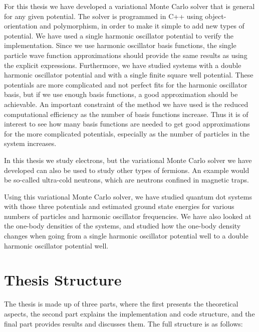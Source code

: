 \documentclass[../main.tex]{subfiles}
\begin{document}
For this thesis we have developed a variational Monte Carlo solver that is general for any given potential. The solver is programmed in C++ using object-orientation and polymorphism, in order to make it simple to add new types of potential. We have used a single harmonic oscillator potential to verify the implementation. Since we use harmonic oscillator basis functions, the single particle wave function approximations should provide the same results as using the explicit expressions. Furthermore, we have studied systems with a double harmonic oscillator potential and with a single finite square well potential. These potentials are more complicated and not perfect fits for the harmonic oscillator basis, but if we use enough basis functions, a good approximation should be achievable. An important constraint of the method we have used is the reduced computational efficiency as the number of basis functions increase. Thus it is of interest to see how many basis functions are needed to get good approximations for the more complicated potentials, especially as the number of particles in the system increases.

In this thesis we study electrons, but the variational Monte Carlo solver we have developed can also be used to study other types of fermions. An example would be so-called ultra-cold neutrons, which are neutrons confined in magnetic traps\cite{ultra-cold neutrons}.

Using this variational Monte Carlo solver, we have studied quantum dot systems with those three potentials and estimated ground state energies for various numbers of particles and harmonic oscillator frequencies. We have also looked at the one-body densities of the systems, and studied how the one-body density changes when going from a single harmonic oscillator potential well to a double harmonic oscillator potential well.

\section*{Thesis Structure}
The thesis is made up of three parts, where the first presents the theoretical aspects, the second part explains the implementation and code structure, and the final part provides results and discusses them. The full structure is as follows:
\end{document}
